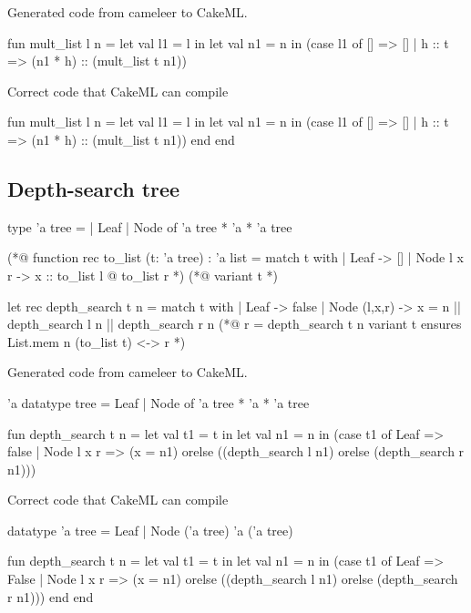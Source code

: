 Generated code from cameleer to CakeML.

\begin{cakeml}
    fun mult_list l n = let val l1 = l in
        let val n1 = n in
        (case l1 of
            [] => []
        | h :: t => (n1 * h) :: (mult_list t n1))
\end{cakeml}

Correct code that CakeML can compile

\begin{cakeml}
    fun mult_list l n = let val l1 = l in
        let val n1 = n in
        (case l1 of
            [] => []
        | h :: t => (n1 * h) :: (mult_list t n1))
        end end
\end{cakeml}

\subsection{Depth-search tree}

\begin{gospell}
type 'a tree =
    | Leaf
    | Node of 'a tree * 'a * 'a tree

(*@ function rec to_list (t: 'a tree) : 'a list = 
  match t with
  | Leaf -> []
  | Node l x r -> x :: to_list l @ to_list r
*)
(*@
  variant t
*)

let rec depth_search t n = 
  match t with
  | Leaf -> false
  | Node (l,x,r) -> x = n || depth_search l n || depth_search r n
(*@
  r = depth_search t n
  variant t
  ensures List.mem n (to_list t) <-> r
*)
\end{gospell}

Generated code from cameleer to CakeML.

\begin{cakeml}
'a datatype tree = Leaf | Node of 'a tree * 'a * 'a tree

fun depth_search t n = let val t1 = t in
  let val n1 = n in
  (case t1 of
    Leaf => false
  | Node l x r =>
    (x = n1) orelse ((depth_search l n1) orelse (depth_search r n1)))
\end{cakeml}

Correct code that CakeML can compile

\begin{cakeml}
datatype 'a tree = Leaf | Node ('a tree) 'a ('a tree)

fun depth_search t n = let val t1 = t in
  let val n1 = n in
  (case t1 of
    Leaf => False
  | Node l x r =>
    (x = n1) orelse ((depth_search l n1) orelse (depth_search r n1)))
    end end
\end{cakeml}

